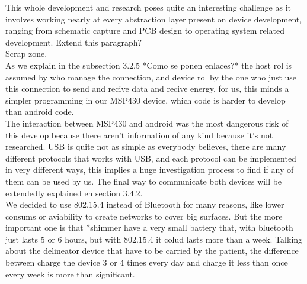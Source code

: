 

	This whole development and research poses quite an interesting challenge as it involves working nearly at every abstraction layer present on device development, ranging from schematic capture and PCB design to operating system related development.
	Extend this paragraph?\\
	
	Scrap zone.\\

	As we explain in the subsection 3.2.5 *Como se ponen enlaces?* the host rol is assumed by who manage the connection, and device rol by the one who just use this connection to send and recive data and recive energy, for us, this minds a simpler programming in our MSP430 device, which code is harder to develop than android code.\\

	The interaction between MSP430 and android was the most dangerous risk of this develop because there aren't information of any kind because it's not researched. USB is quite not as simple as everybody believes, there are many different protocols that works with USB, and each protocol can be implemented in very different ways, this implies a huge investigation process to find if any of them can be used by us. The final way to communicate both devices will be extendedly explained en section 3.4.2.\\

	We decided to use 802.15.4 instead of Bluetooth for many reasons, like lower consums or aviability to create networks to cover big surfaces. But the more important one is that *shimmer have a very small battery that, with bluetooth just lasts 5 or 6 hours, but with 802.15.4 it colud lasts more than a week. Talking about the delineator device that have to be carried by the patient, the difference between charge the device 3 or 4 times every day and charge it less than once every week is more than significant.\\

